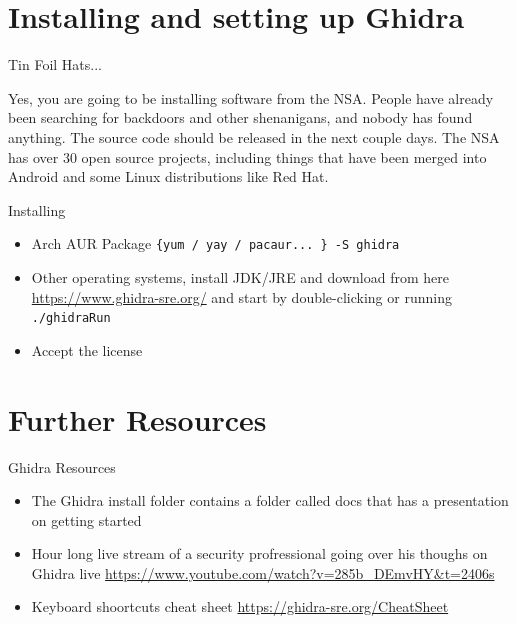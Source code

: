 \documentclass{beamer}
\begin{document}
\section{Installing and setting up Ghidra}

\begin{frame}{Tin Foil Hats...}

  Yes, you are going to be installing software from the NSA. People
  have already been searching for backdoors and other shenanigans, and
  nobody has found anything. The source code should be released in the
  next couple days. The NSA has over 30 open source projects,
  including things that have been merged into Android and some Linux
  distributions like Red Hat.
\end{frame}

\begin{frame}{Installing}
  \begin{itemize}
    \item Arch AUR Package \texttt{\{yum / yay / pacaur... \} -S
        ghidra}
      \item Other operating systems, install JDK/JRE and download from
        here \url{https://www.ghidra-sre.org/} and start by
        double-clicking or running \texttt{./ghidraRun}
      \item Accept the license
  \end{itemize}
\end{frame}


\section{Further Resources}

\begin{frame}{Ghidra Resources}
  \begin{itemize}
    \item{ The Ghidra install folder contains a folder called docs
        that has a presentation on getting started }
    \item  {Hour long live stream of a security profressional going over his
      thoughs on Ghidra live
      \url{https://www.youtube.com/watch?v=285b_DEmvHY\&t=2406s}}
    \item {Keyboard shoortcuts cheat sheet
      \url{https://ghidra-sre.org/CheatSheet}}
    \end{itemize}
\end{frame}
\end{document}

